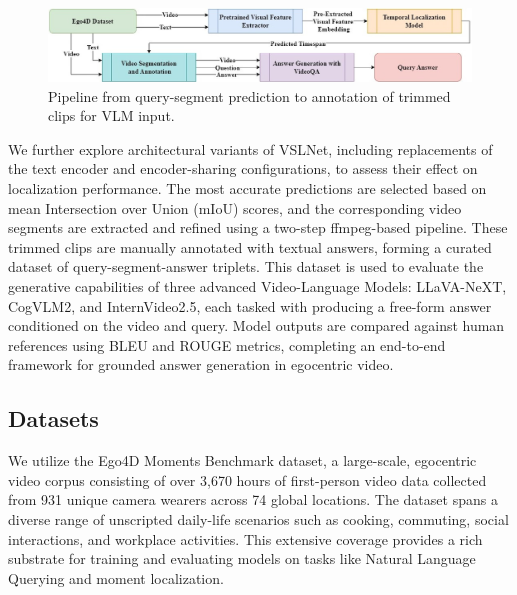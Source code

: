 \documentclass[10pt,twocolumn,letterpaper]{article}
\begin{document}
		\begin{figure}[htbp]
		\centering
		\includegraphics[width=\textwidth]{FullDiagram.jpg}  %
		\caption{Pipeline from query-segment prediction to annotation of trimmed clips for VLM input.}
		\label{fig:FullDiagram}
	\end{figure}
		
We further explore architectural variants of VSLNet, including replacements of the text encoder and encoder-sharing configurations, to assess their effect on localization performance. The most accurate predictions are selected based on mean Intersection over Union (mIoU) scores, and the corresponding video segments are extracted and refined using a two-step ffmpeg-based pipeline. These trimmed clips are manually annotated with textual answers, forming a curated dataset of query-segment-answer triplets. This dataset is used to evaluate the generative capabilities of three advanced Video-Language Models: LLaVA-NeXT, CogVLM2, and InternVideo2.5, each tasked with producing a free-form answer conditioned on the video and query. Model outputs are compared against human references using BLEU and ROUGE metrics, completing an end-to-end framework for grounded answer generation in egocentric video.
	
	
	
	
\subsection{Datasets}
	
We utilize the Ego4D Moments Benchmark dataset\cite{1_Ego4D_Around_the_World_in_3000_Hours_of_Egocentric_Video}, a large-scale, egocentric video corpus consisting of over 3,670 hours of first-person video data collected from 931 unique camera wearers across 74 global locations. The dataset spans a diverse range of unscripted daily-life scenarios such as cooking, commuting, social interactions, and workplace activities. This extensive coverage provides a rich substrate for training and evaluating models on tasks like Natural Language Querying and moment localization.
	
\end{document}
